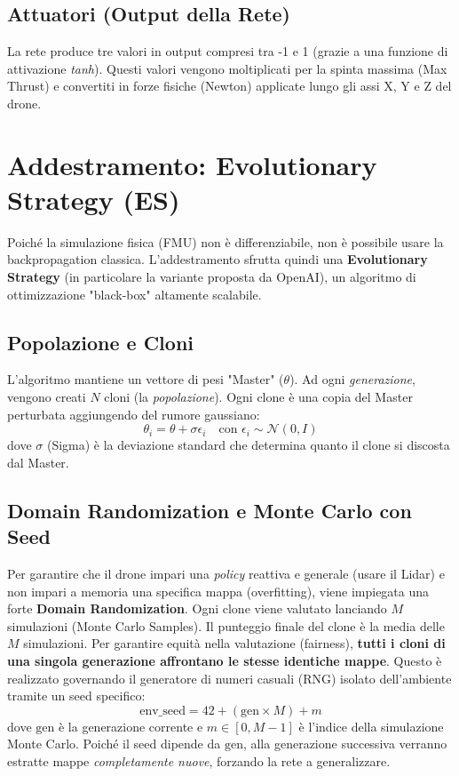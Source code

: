 \documentclass[12pt,a4paper]{article}
\begin{document}
\subsection{Attuatori (Output della Rete)}
La rete produce tre valori in output compresi tra -1 e 1 (grazie a una funzione di attivazione \textit{tanh}). Questi valori vengono moltiplicati per la spinta massima (Max Thrust) e convertiti in forze fisiche (Newton) applicate lungo gli assi X, Y e Z del drone.

\section{Addestramento: Evolutionary Strategy (ES)}
Poiché la simulazione fisica (FMU) non è differenziabile, non è possibile usare la backpropagation classica. L'addestramento sfrutta quindi una \textbf{Evolutionary Strategy} (in particolare la variante proposta da OpenAI), un algoritmo di ottimizzazione "black-box" altamente scalabile.

\subsection{Popolazione e Cloni}
L'algoritmo mantiene un vettore di pesi "Master" ($\theta$). Ad ogni \textit{generazione}, vengono creati $N$ cloni (la \textit{popolazione}). Ogni clone è una copia del Master perturbata aggiungendo del rumore gaussiano:
\begin{equation}
    \theta_i = \theta + \sigma \epsilon_i \quad \text{con } \epsilon_i \sim \mathcal{N}(0, I)
\end{equation}
dove $\sigma$ (Sigma) è la deviazione standard che determina quanto il clone si discosta dal Master.

\subsection{Domain Randomization e Monte Carlo con Seed}
Per garantire che il drone impari una \textit{policy} reattiva e generale (usare il Lidar) e non impari a memoria una specifica mappa (overfitting), viene impiegata una forte \textbf{Domain Randomization}.
Ogni clone viene valutato lanciando $M$ simulazioni (Monte Carlo Samples). Il punteggio finale del clone è la media delle $M$ simulazioni.
Per garantire equità nella valutazione (fairness), \textbf{tutti i cloni di una singola generazione affrontano le stesse identiche mappe}. Questo è realizzato governando il generatore di numeri casuali (RNG) isolato dell'ambiente tramite un seed specifico:
\begin{equation}
    \text{env\_seed} = 42 + (\text{gen} \times M) + m
\end{equation}
dove $\text{gen}$ è la generazione corrente e $m \in [0, M-1]$ è l'indice della simulazione Monte Carlo. 
Poiché il seed dipende da $\text{gen}$, alla generazione successiva verranno estratte mappe \textit{completamente nuove}, forzando la rete a generalizzare.
\end{document}
